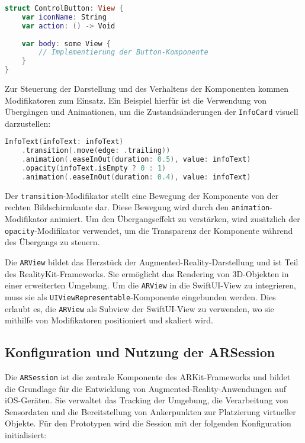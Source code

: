 \begin{lstlisting}[language=Swift]
struct ControlButton: View {
    var iconName: String
    var action: () -> Void
        
    var body: some View {
        // Implementierung der Button-Komponente
    }
}
\end{lstlisting}

Zur Steuerung der Darstellung und des Verhaltens der Komponenten kommen Modifikatoren zum Einsatz. Ein Beispiel hierfür ist die Verwendung von Übergängen und Animationen, um die Zustandsänderungen der \texttt{InfoCard} visuell darzustellen:

\begin{lstlisting}[language=Swift]
InfoText(infoText: infoText)
    .transition(.move(edge: .trailing))
    .animation(.easeInOut(duration: 0.5), value: infoText)
    .opacity(infoText.isEmpty ? 0 : 1)
    .animation(.easeInOut(duration: 0.4), value: infoText)
\end{lstlisting}

Der \texttt{transition}-Modifikator stellt eine Bewegung der Komponente von der rechten Bildschirmkante dar. Diese Bewegung wird durch den \texttt{animation}-Modifikator animiert. Um den Übergangseffekt zu verstärken, wird zusätzlich der \texttt{opacity}-Modifikator verwendet, um die Transparenz der Komponente während des Übergangs zu steuern.

Die \texttt{ARView} bildet das Herzstück der Augmented-Reality-Darstellung und ist Teil des RealityKit-Frameworks. Sie ermöglicht das Rendering von 3D-Objekten in einer erweiterten Umgebung. Um die \texttt{ARView} in die SwiftUI-View zu integrieren, muss sie als \texttt{UIViewRepresentable}-Komponente eingebunden werden. Dies erlaubt es, die \texttt{ARView} als Subview der SwiftUI-View zu verwenden, wo sie mithilfe von Modifikatoren positioniert und skaliert wird.

\subsection{Konfiguration und Nutzung der ARSession}

Die \texttt{ARSession} ist die zentrale Komponente des ARKit-Frameworks und bildet die Grundlage für die Entwicklung von Augmented-Reality-Anwendungen auf iOS-Geräten. Sie verwaltet das Tracking der Umgebung, die Verarbeitung von Sensordaten und die Bereitstellung von Ankerpunkten zur Platzierung virtueller Objekte. Für den Prototypen wird die Session mit der folgenden Konfiguration initialisiert:

